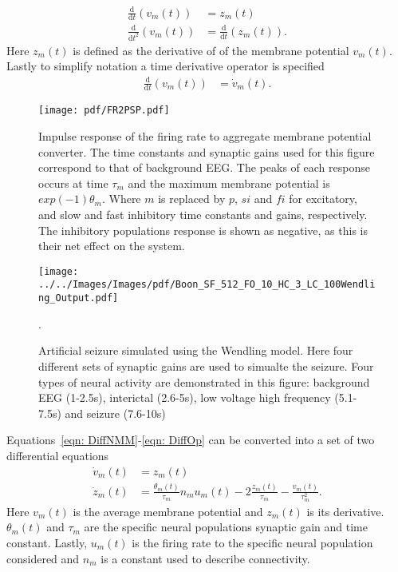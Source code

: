 \begin{align}
\label{eqn: dummy1}
\frac{\mathrm{d}}{\mathrm{d}t}(v_{m}(t)) &= z_{m}(t)\\
\label{eqn: dummy2}
\frac{\mathrm{d}}{\mathrm{d}t^2}(v_{m}(t)) &= \frac{\mathrm{d}}{\mathrm{d}t}(z_{m}(t)).\end{align} Here $z_{m}(t)$ is defined as the derivative of of the membrane potential $v_{m}(t)$. Lastly to simplify notation a time derivative operator is specified \begin{align}%
\label{eqn: DiffOp}
\frac{\mathrm{d}}{\mathrm{d}t}(v_{m}(t)) &= \dot{v}_{m}(t).
\end{align} %
\begin{figure}%
	\centering
		\texttt{[image: pdf/FR2PSP.pdf]}
	\caption{Impulse response of the firing rate to aggregate membrane potential converter. The time constants and synaptic gains used for this figure correspond to that of background EEG. The peaks of each response occurs at time $\tau_{m}$ and the maximum membrane potential is $exp(-1)\theta_{m}$. Where $m$ is replaced by $p$, $si$ and $fi$ for excitatory, and slow and fast inhibitory time constants and gains, respectively. The inhibitory populations response is shown as negative, as this is their net effect on the system.}
	\label{fig: FR2PSP_final}
\end{figure} %
\begin{figure}%
	\centering
		\texttt{[image: ../../Images/Images/pdf/Boon\_SF\_512\_FO\_10\_HC\_3\_LC\_100Wendling\_Output.pdf]}
	\caption{Artificial seizure simulated using the Wendling model. Here four different sets of synaptic gains are used to simualte the seizure. Four types of neural activity are demonstrated in this figure: background EEG (1-2.5s), interictal (2.6-5s), low voltage high frequency (5.1-7.5s) and seizure (7.6-10s)}.
	\label{fig: SeizureSim}
\end{figure}%
Equations~\ref{eqn: DiffNMM}-\ref{eqn: DiffOp} can be converted into a set of two differential equations \begin{align}%
\label{eqn: FR2PSP1}
\dot{v}_{m}(t)&= z_{m}(t)\\
\label{eqn: FR2PSP2}
\dot{z}_{m}(t)&=\frac{\theta_{m}(t)}{\tau_{m}}n_{m}u_{m}(t)-2\frac{z_{m}(t)}{\tau_{m}}-\frac{v_{m}(t)}{\tau_{m}^{2}}.
\end{align} Here $v_{m}(t)$ is the average membrane potential and $z_{m}(t)$ is its derivative. $\theta_{m}(t)$ and $\tau_{m}$ are the specific neural populations synaptic gain and time constant. Lastly, $u_{m}(t)$ is the firing rate to the specific neural population considered and $n_{m}$ is a constant used to describe connectivity.

